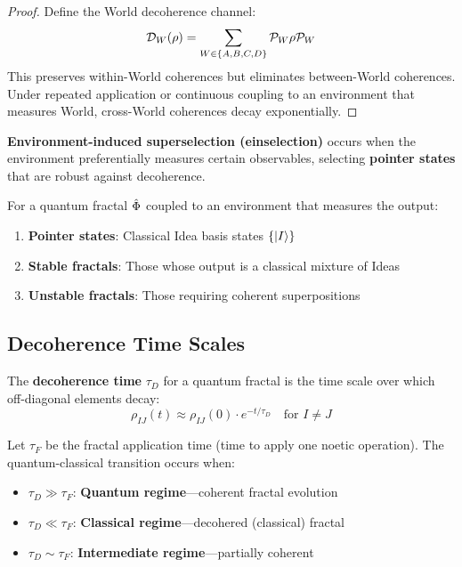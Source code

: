 \begin{proof}
Define the World decoherence channel:
\[
\mathcal{D}_W(\rho) = \sum_{W \in \{A,B,C,D\}} \mathcal{P}_W \rho \mathcal{P}_W
\]
This preserves within-World coherences but eliminates between-World coherences. Under repeated application or continuous coupling to an environment that measures World, cross-World coherences decay exponentially.
\end{proof}

\begin{definition}[Einselection]
\label{def:einselection}
\textbf{Environment-induced superselection (einselection)} occurs when the environment preferentially measures certain observables, selecting \textbf{pointer states} that are robust against decoherence.
\end{definition}

\begin{proposition}
\label{prop:pointer-states}
For a quantum fractal $\hat{\Phi}$ coupled to an environment that measures the output:
\begin{enumerate}
  \item \textbf{Pointer states}: Classical Idea basis states $\{|I\rangle\}$
  \item \textbf{Stable fractals}: Those whose output is a classical mixture of Ideas
  \item \textbf{Unstable fractals}: Those requiring coherent superpositions
\end{enumerate}
\end{proposition}

\subsection{Decoherence Time Scales}

\begin{definition}
\label{def:decoherence-time}
The \textbf{decoherence time} $\tau_D$ for a quantum fractal is the time scale over which off-diagonal elements decay:
\[
\rho_{IJ}(t) \approx \rho_{IJ}(0) \cdot e^{-t/\tau_D} \quad \text{for } I \neq J
\]
\end{definition}

\begin{theorem}
\label{thm:fractal-decoherence}
Let $\tau_F$ be the fractal application time (time to apply one noetic operation). The quantum-classical transition occurs when:
\begin{itemize}
  \item $\tau_D \gg \tau_F$: \textbf{Quantum regime}---coherent fractal evolution
  \item $\tau_D \ll \tau_F$: \textbf{Classical regime}---decohered (classical) fractal
  \item $\tau_D \sim \tau_F$: \textbf{Intermediate regime}---partially coherent
\end{itemize}
\end{theorem}

